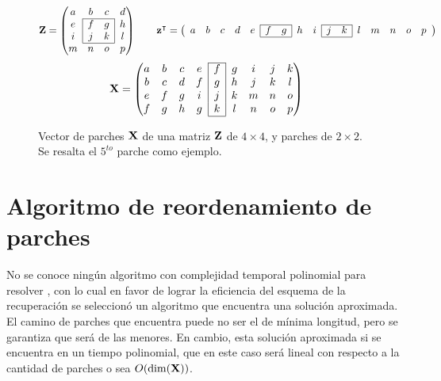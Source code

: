 \begin{figure}[H]
	\[\Z = \left(
		\begin{matrix}
			a & b & c & d\\\cline{2-3}
			e & \multicolumn{1}{|c}{f} & \multicolumn{1}{c|}{g} & h\\
			i & \multicolumn{1}{|c}{j} & \multicolumn{1}{c|}{k} & l\\\cline{2-3}
			m & n & o & p\\
		\end{matrix}
	\right)
	\qquad\z^\intercal = \left(
		\begin{array}{ccccc|cc|cc|cc|ccccc}
			\cline{6-7}\cline{10-11}
			a & b & c & d & e & f & g & h & i & j & k & l & m & n & o & p \\
			\cline{6-7}\cline{10-11}
		\end{array}
	\right)\]
	\[\X = \left(
		\begin{matrix}\cline{5-5}
			a & b & c & e & \multicolumn{1}{|c|}{f} & g & i & j & k\\
			b & c & d & f & \multicolumn{1}{|c|}{g} & h & j & k & l\\
			e & f & g & i & \multicolumn{1}{|c|}{j} & k & m & n & o\\
			f & g & h & g & \multicolumn{1}{|c|}{k} & l & n & o & p\\\cline{5-5}
		\end{matrix}
	\right)\]
	\caption{Vector de parches $\mathbf{X}$ de una matriz $\mathbf{Z}$ de $4 \times 4$, y parches de $2 \times 2$. Se resalta el $5^{to}$ parche como ejemplo.}
	\label{ex:vector_X}
\end{figure}

\section{Algoritmo de reordenamiento de parches}

No se conoce ningún algoritmo con complejidad temporal polinomial para resolver \TSP, con lo cual en favor de lograr la eficiencia del esquema de la recuperaci\'on se seleccion\'o un algoritmo que encuentra una soluci\'on aproximada. El camino de parches que encuentra puede no ser el de m\'inima longitud, pero se garantiza que ser\'a de las menores. En cambio, esta soluci\'on aproximada si se encuentra en un tiempo polinomial, que en este caso ser\'a lineal con respecto a la cantidad de parches o sea $O(\dim(\mathbf{X}))$.


